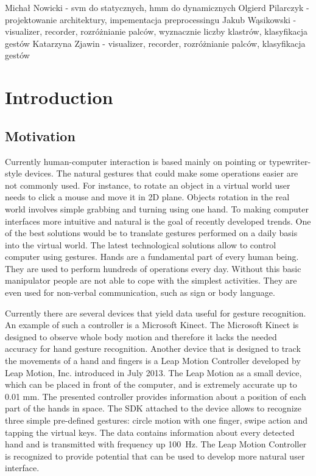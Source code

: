{\color{red} Michał Nowicki - svm do statycznych, hmm do dynamicznych
Olgierd Pilarczyk - projektowanie architektury, impementacja preprocessingu
Jakub Wąsikowski - visualizer, recorder, rozróżnianie palców, wyznacznie liczby klastrów, klasyfikacja gestów
Katarzyna Zjawin - visualizer, recorder, rozróżnianie palców, klasyfikacja gestów}



\chapter{Introduction}

\section{Motivation}

Currently human-computer interaction is based mainly on pointing or typewriter-style devices. 
The natural gestures that could make some operations easier are not commonly used. 
For instance, to rotate an object in a virtual world user needs to click a mouse and move it in 2D plane. 
Objects rotation in the real world involves simple grabbing and turning using one hand. 
To making computer interfaces more intuitive and natural is the goal of recently developed trends. 
One of the best solutions would be to translate gestures performed on a daily basis into the virtual world. 
The latest technological solutions allow to control computer using gestures.
Hands are a fundamental part of every human being. They are used to perform hundreds of operations every day. 
Without this basic manipulator people are not able to cope with the simplest activities. 
They are even used for non-verbal communication, such as sign or body language.

Currently there are several devices that yield data useful for gesture recognition. 
An example of such a controller is a Microsoft Kinect.
The Microsoft Kinect is designed to observe whole body motion and therefore it lacks the needed accuracy for hand gesture recognition.  
Another device that is designed to track the movements of a hand and fingers is a Leap Motion Controller developed by Leap Motion, Inc. introduced in July 2013. 
The Leap Motion as a small device, which can be placed in front of the computer, and is extremely accurate up to 0.01 mm. 
The presented controller provides information about a position of each part of the hands in space.
The SDK attached to the device allows to recognize three simple pre-defined gestures: circle motion with one finger, swipe action and tapping the virtual keys. 
The data contains information about every detected hand and is transmitted with frequency up 100~Hz. 
The Leap Motion Controller is recognized to provide potential that can be used to develop more natural user interface. 

